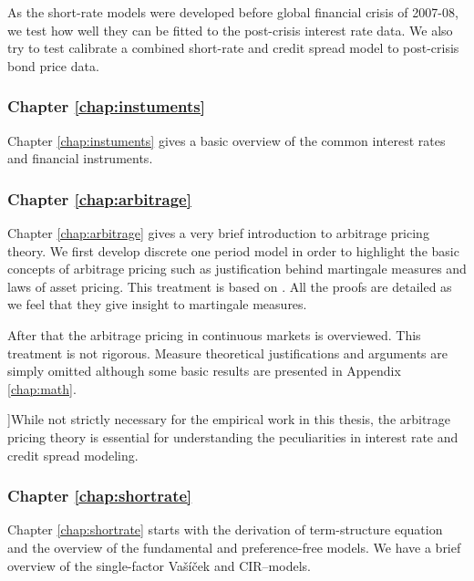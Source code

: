 As the short-rate models were developed before global financial crisis of 2007-08, we test how well they can be fitted to the post-crisis interest rate data. We also try to test calibrate a combined short-rate and credit spread model to post-crisis bond price data.

\subsubsection*{Chapter \ref{chap:instuments}}

Chapter \ref{chap:instuments} gives a basic overview of the common interest rates and financial instruments.

\subsubsection*{Chapter \ref{chap:arbitrage}}

Chapter \ref{chap:arbitrage} gives a very brief introduction to arbitrage pricing theory. We first develop discrete one period model in order to highlight the basic concepts of arbitrage pricing such as justification behind martingale measures and laws of asset pricing. This treatment is based on \textcite[pp. 5--34]{bjork2004arbitrage}. All the proofs are detailed as we feel that they give insight to martingale measures.  

After that the arbitrage pricing in continuous markets is overviewed. This treatment is not rigorous. Measure theoretical justifications and arguments are simply omitted although some basic results are  presented in Appendix \ref{chap:math}.

\added]{While not strictly necessary for the empirical work in this thesis, the arbitrage pricing theory is essential for understanding the peculiarities in interest rate and credit spread modeling.}

\subsubsection*{Chapter \ref{chap:shortrate}}

Chapter \ref{chap:shortrate} starts with the derivation of term-structure equation and the overview of the fundamental and preference-free models. We have a brief overview of the single-factor Va\v{s}\'{i}\v{c}ek and CIR--models. 

